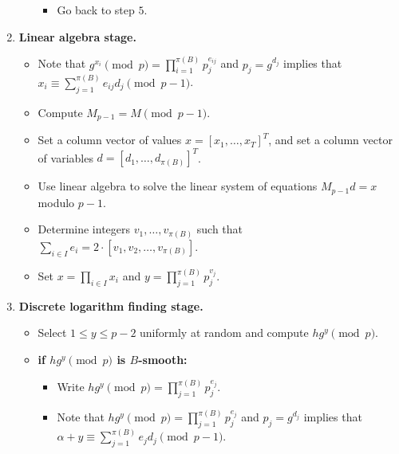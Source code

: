 \begin{algo}
\begin{enumerate}[1.]
\begin{itemize}
                              \begin{itemize}[$\circ$]
                                    \item Go back to step $5$. 
                              \end{itemize}
                  \end{itemize}
            \item {\bf Linear algebra stage.} 
                  \begin{itemize}
                        \item Note that $g^{x_i} \pmod p = \prod_{i=1}^{\pi(B)} p_j^{e_{ij}}$ and $p_j = g^{d_j}$ 
                              implies that $x_i \equiv \sum_{j=1}^{\pi(B)} e_{ij} d_j \pmod{p-1}$. 
                        \item Compute $M_{p-1} = M \pmod{p-1}$. 
                        \item Set a column vector of values $x = [x_1, \dots, x_T]^T$, and set a column vector of 
                              variables $d = [d_1, \dots, d_{\pi(B)}]^T$. 
                        \item Use linear algebra to solve the linear system of equations $M_{p-1}d = x$ modulo $p-1$. 
                        \item Determine integers $v_1, \dots, v_{\pi(B)}$ such that $\sum_{i\in I} e_i = 2 \cdot 
                              [v_1, v_2, \dots, v_{\pi(B)}]$. 
                        \item Set $x = \prod_{i\in I} x_i$ and $y = \prod_{j=1}^{\pi(B)} p_j^{v_j}$. 
                  \end{itemize}
            \item {\bf Discrete logarithm finding stage.} 
                  \begin{itemize}
                        \item Select $1 \leq y \leq p-2$ uniformly at random and compute $hg^y \pmod p$. 
                        \item {\bf if $hg^y \pmod p$ is $B$-smooth:} 
                              \begin{itemize}[$\circ$]
                                    \item Write $hg^y \pmod p = \prod_{j=1}^{\pi(B)} p_j^{e_j}$. 
                                    \item Note that $hg^y \pmod p = \prod_{j=1}^{\pi(B)} p_j^{e_j}$ and $p_j = g^{d_j}$ 
                                          implies that $\alpha + y \equiv \sum_{j=1}^{\pi(B)} e_j d_j \pmod{p-1}$. 

\end{itemize}
\end{itemize}
\end{enumerate}
\end{algo}
